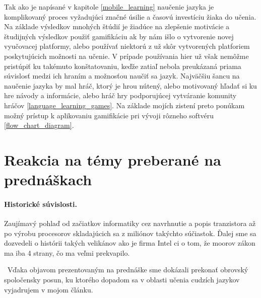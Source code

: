 \documentclass[10pt,slovak,a4paper]{article}
\begin{document}
Tak ako je napísané v kapitole \ref{mobile_learning} naučenie jazyka je komplikovaný proces vyžadujúci značné úsilie a časovú investíciu žiaka do učenia.
Na základe výsledkov mnohých štúdií je žiadúce na zlepšenie motivácie a študijných výsledkov použiť gamifikáciu ak by nám išlo o vytvorenie novej vyučovacej platformy, alebo používať niektorú z už skôr vytvorených platforiem poskytujúcich možnosti na učenie.
V prípade používania hier už však nemôžme pristúpiť ku takémuto konštatovaniu, keďže zatiaľ nebola preukázaná priama súvislosť medzi ich hraním a možnosťou naučiť sa jazyk.
Najväčšiu šancu na naučenie jazyka by mal hráč, ktorý je hrou nútený, alebo motivovaný hľadať si ku hre návody a informácie, alebo hráč hry podporujúcej vytváranie komunity hráčov \ref{language_learning_games}.
Na základe mojích zistení preto ponúkam možný prístup k aplikovaniu gamifikácie pri vývoji rôzneho softvéru \ref{flow_chart_diagram}.

\newpage
\section{Reakcia na témy preberané na prednáškach} \label{reaction_to_lectures}


\paragraph{Historické súvislosti.}

Zaujímavý pohlaď od začiatkov informatiky cez navrhnutie a popis tranzistora až po výrobu procesorov skladajúcich sa z miliónov takýchto súčiastok.
Ďalej sme sa dozvedeli o histórii takých velikánov ako je firma Intel ci o tom, že moorov zákon ma iba 4 strany, čo ma veľmi prekvapilo.

\indent~Vďaka objavom prezentovaným na prednáške sme dokázali prekonať obrovský spoločensky posun, ku ktorého dopadom sa v oblasti učenia cudzích jazykov vyjadrujem v mojom článku.
\end{document}
